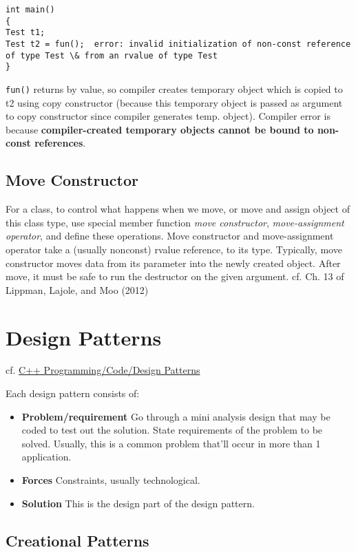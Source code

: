 \documentclass[10pt]{amsart}
\begin{document}
\begin{multicols*}{2}
\begin{lstlisting}
int main()
{
Test t1;
Test t2 = fun();  error: invalid initialization of non-const reference of type Test \& from an rvalue of type Test 
}
\end{lstlisting}

\verb|fun()| returns by value, so compiler creates temporary object which is copied to t2 using copy constructor (because this temporary object is passed as argument to copy constructor since compiler generates temp. object).  
Compiler error is because \textbf{compiler-created temporary objects cannot be bound to non-const references}. 



\subsection{Move Constructor}  

For a class, to control what happens when we move, or move and assign object of this class type, use special member function \emph{move constructor}, \emph{move-assignment operator}, and define these operations.  Move constructor and move-assignment operator take a (usually nonconst) rvalue reference, to its type.  Typically, move constructor moves data from its parameter into the newly created object.  After move, it must be safe to run the destructor on the given argument.  cf. Ch. 13 of Lippman, Lajole, and Moo (2012) \cite{LLM2012}




\section{Design Patterns}

cf. \href{https://en.wikibooks.org/wiki/C%2B%2B_Programming/Code/Design_Patterns}{C++ Programming/Code/Design Patterns}  

Each design pattern consists of:
\begin{itemize}
	\item \textbf{Problem/requirement}  Go through a mini analysis design that may be coded to test out the solution.  State requirements of the problem to be solved.  Usually, this is a common problem that'll occur in more than 1 application.  
	\item  \textbf{Forces} Constraints, usually technological.  
	\item \textbf{Solution}  This is the design part of the design pattern.  
\end{itemize}

\subsection{Creational Patterns}  


\end{multicols*}
\end{document}
